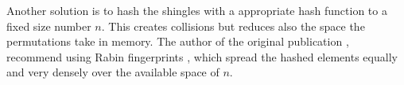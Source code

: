 Another solution is to hash the shingles with a appropriate hash function to a fixed size number $ n $. This creates collisions but reduces also the space the permutations take in memory. The author of the original publication \cite{minhash}, recommend using Rabin fingerprints \cite{rabinFingerprinting}, which spread the hashed elements equally and very densely over the available space of $ n $.